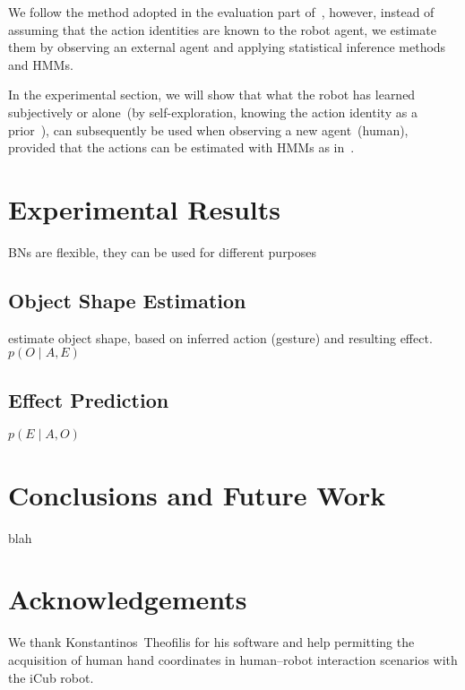\documentclass[a4paper]{article}
\newcommand{\hr}{human--robot}
\newcommand{\hri}{\hr{} interaction}
\begin{document}
We follow the method adopted in the evaluation part of~\cite{salvi:2012:smcb}, however, instead of assuming that the action identities are known to the robot agent, we estimate them by observing an external agent and applying statistical inference methods and \acp{HMM}.

In the experimental section, we will show that what the robot has learned subjectively or alone~(by self-exploration, knowing the action identity as a prior~\cite{salvi:2012:smcb}), can subsequently be used when observing a new agent~(human), provided that the actions can be estimated with \acp{HMM} as in~\cite{saponaro:2013:crhri}.

\section{Experimental Results}

\acp{BN} are flexible, they can be used for different purposes

\subsection{Object Shape Estimation}

estimate object shape, based on inferred action (gesture) and resulting effect. $p(O \mid A, E)$

\subsection{Effect Prediction}

$p(E \mid A, O)$


\section{Conclusions and Future Work}

blah

\section{Acknowledgements}
We thank Konstantinos~Theofilis for his software and help permitting the acquisition of human hand coordinates in \hri{} scenarios with the iCub robot.%

\nocite{*} %

%

\end{document}
